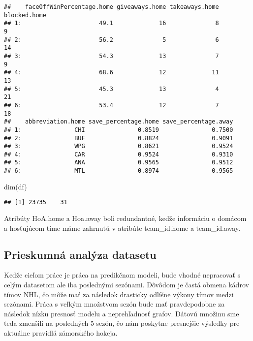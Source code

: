 \documentclass[
]{article}
\newenvironment{Shaded}{\begin{snugshade}}{\end{snugshade}}
\newcommand{\FunctionTok}[1]{\textcolor[rgb]{0.00,0.00,0.00}{#1}}
\newcommand{\NormalTok}[1]{#1}
\begin{document}
\begin{verbatim}
##    faceOffWinPercentage.home giveaways.home takeaways.home blocked.home
## 1:                      49.1             16              8            9
## 2:                      56.2              5              6           14
## 3:                      54.3             13              7            9
## 4:                      68.6             12             11           13
## 5:                      45.3             13              4           21
## 6:                      53.4             12              7           18
##    abbreviation.home save_percentage.home save_percentage.away
## 1:               CHI               0.8519               0.7500
## 2:               BUF               0.8824               0.9091
## 3:               WPG               0.8621               0.9524
## 4:               CAR               0.9524               0.9310
## 5:               ANA               0.9565               0.9512
## 6:               MTL               0.8974               0.9565
\end{verbatim}

\begin{Shaded}
\begin{Highlighting}[]
\FunctionTok{dim}\NormalTok{(df)}
\end{Highlighting}
\end{Shaded}

\begin{verbatim}
## [1] 23735    31
\end{verbatim}

Atribúty HoA.home a Hoa.away boli redundantné, keďže informáciu o
domácom a hosťujúcom tíme máme zahrnutú v atribúte team\_id.home a
team\_id.away.

\hypertarget{prieskumnuxe1-analuxfdza-datasetu}{%
\subsection{Prieskumná analýza
datasetu}\label{prieskumnuxe1-analuxfdza-datasetu}}

Kedže cieľom práce je práca na predikčnom modeli, bude vhodné nepracovať
s celým datasetom ale iba poslednými sezónami. Dôvôdom je častá obmena
kádrov tímov NHL, čo môže mať za následok drasticky odlíšne výkony tímov
medzi sezónami. Práca s veľkým množstvom sezón bude mať pravdepodobne za
následok nízku presnosť modelu a neprehľadnosť grafov. Dátovú množinu
sme teda zmenšili na posledných 5 sezón, čo nám poskytne presnejšie
výsledky pre aktuálne pravidlá zámorského hokeja.
\end{document}
